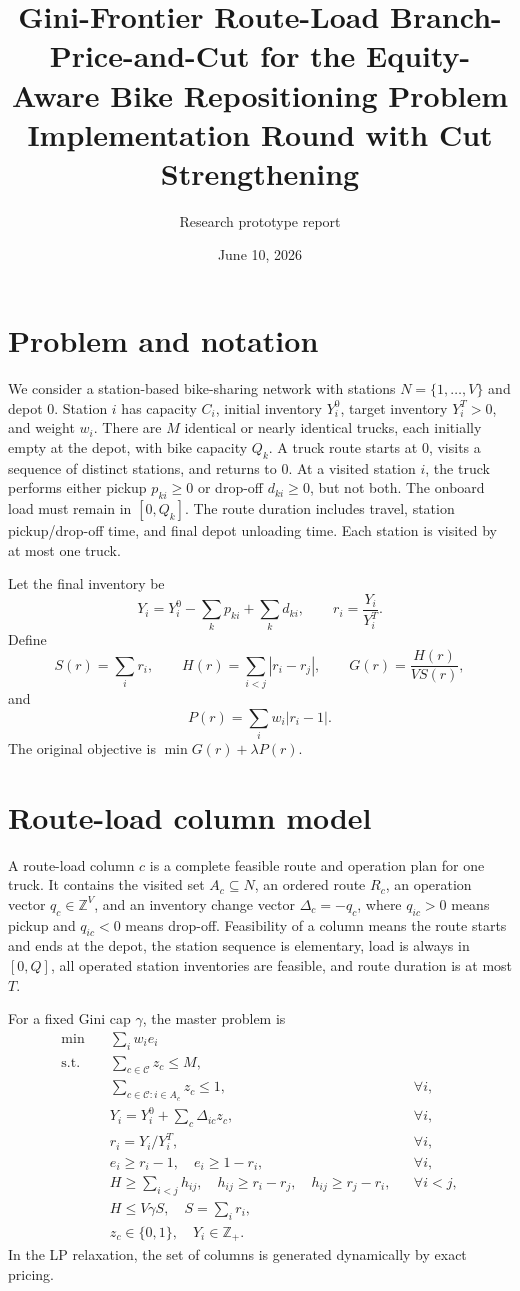 \documentclass[11pt]{article}
\title{Gini-Frontier Route-Load Branch-Price-and-Cut for the Equity-Aware Bike Repositioning Problem\\Implementation Round with Cut Strengthening}
\author{Research prototype report}
\date{June 10, 2026}
\begin{document}
\maketitle

\section{Problem and notation}
We consider a station-based bike-sharing network with stations $N=\{1,\ldots,V\}$ and depot 0. Station $i$ has capacity $C_i$, initial inventory $Y_i^0$, target inventory $Y_i^T>0$, and weight $w_i$. There are $M$ identical or nearly identical trucks, each initially empty at the depot, with bike capacity $Q_k$. A truck route starts at 0, visits a sequence of distinct stations, and returns to 0. At a visited station $i$, the truck performs either pickup $p_{ki}\ge 0$ or drop-off $d_{ki}\ge 0$, but not both. The onboard load must remain in $[0,Q_k]$. The route duration includes travel, station pickup/drop-off time, and final depot unloading time. Each station is visited by at most one truck.

Let the final inventory be
\[
Y_i=Y_i^0-\sum_k p_{ki}+\sum_k d_{ki},\qquad r_i=\frac{Y_i}{Y_i^T}.
\]
Define
\[
S(r)=\sum_i r_i,\qquad H(r)=\sum_{i<j}|r_i-r_j|,
\qquad G(r)=\frac{H(r)}{V S(r)},
\]
and
\[
P(r)=\sum_i w_i |r_i-1|.
\]
The original objective is $\min G(r)+\lambda P(r)$.

\section{Route-load column model}
A route-load column $c$ is a complete feasible route and operation plan for one truck. It contains the visited set $A_c\subseteq N$, an ordered route $R_c$, an operation vector $q_c\in\mathbb{Z}^{V}$, and an inventory change vector $\Delta_c=-q_c$, where $q_{ic}>0$ means pickup and $q_{ic}<0$ means drop-off. Feasibility of a column means the route starts and ends at the depot, the station sequence is elementary, load is always in $[0,Q]$, all operated station inventories are feasible, and route duration is at most $T$.

For a fixed Gini cap $\gamma$, the master problem is
\begin{align}
\min \quad & \sum_i w_i e_i \\
\text{s.t.}\quad
& \sum_{c\in\mathcal{C}} z_c \le M, \\
& \sum_{c\in\mathcal{C}:i\in A_c} z_c \le 1, &&\forall i, \\
& Y_i=Y_i^0+\sum_c \Delta_{ic} z_c, &&\forall i, \\
& r_i=Y_i/Y_i^T, &&\forall i, \\
& e_i\ge r_i-1,\quad e_i\ge 1-r_i, &&\forall i, \\
& H\ge \sum_{i<j} h_{ij},\quad h_{ij}\ge r_i-r_j,\quad h_{ij}\ge r_j-r_i, &&\forall i<j, \\
& H\le V\gamma S,\quad S=\sum_i r_i,\\
& z_c\in\{0,1\},\quad Y_i\in\mathbb{Z}_+.
\end{align}
In the LP relaxation, the set of columns is generated dynamically by exact pricing.
\end{document}
